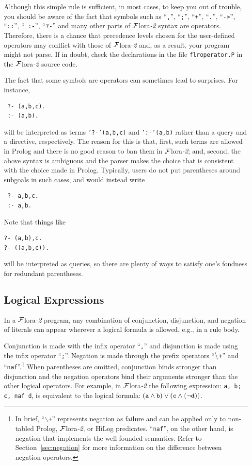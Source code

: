 \documentclass[11pt]{article}
\newcommand{\FLORA}{{\mbox{\sc ${\cal F}${lora}\rm\emph{-2}}}\xspace}
\newcommand{\PLGNAF}{\mbox{\tt \ensuremath{\tt\backslash}+}\xspace}
\newcommand{\SILKNAF}{{{\tt naf}}\xspace}
\begin{document}
Although this simple rule is sufficient, in most cases, to keep you out of
trouble, you should be aware of the fact that symbols such as ``{\tt ,}'',
``{\tt ;}'', ``{\tt +}'', ``{\tt .}'', ``{\tt ->}'', ``{\tt ::}'', ``{\tt
  :-}'', ``{\tt ?-}'' and many
other parts of \FLORA syntax are operators. Therefore, there is a chance
that precedence levels chosen for the user-defined operators may conflict with
those of \FLORA and, as a result, your program might not parse. If in
doubt, check the declarations in the file {\tt flroperator.P} in the \FLORA
source code.

The fact that some symbols are operators can sometimes lead to
surprises. For instance,
\begin{verbatim}
 ?- (a,b,c).
 :- (a,b).
\end{verbatim}
will be interpreted as terms {\tt '?-'(a,b,c)} and {\tt ':-'(a,b)} rather
than a query and a directive, respectively. The reason for this is that,
first, such terms are allowed in Prolog and there is no good reason to ban
them in \FLORA; and, second, the above syntax is ambiguous and the parser
makes the choice that is consistent with the choice made in
Prolog. Typically, users do not put parentheses around subgoals in such
cases, and would instead write
\begin{verbatim}
 ?- a,b,c.
 :- a,b.  
\end{verbatim}
Note that things like
\begin{verbatim}
?- (a,b),c.  
?- ((a,b,c)).
\end{verbatim}
will be interpreted as queries, so there are plenty of ways to satisfy
one's fondness for redundant parentheses.


\subsection{Logical Expressions}


%
In a \FLORA program, any combination of conjunction, disjunction, and
negation of literals can appear wherever a logical formula is allowed,
e.g., in a rule body.

Conjunction is made with the infix operator ``{\tt ,}'' and
disjunction is made using the infix operator ``{\tt ;}''.  Negation is made
through the prefix operators ``\PLGNAF'' and ``\SILKNAF''.\footnote{
  In brief, ``{\tt $\backslash$+}'' represents negation as
  failure and can be applied only to non-tabled Prolog, \FLORA, or HiLog
  predicates. ``\SILKNAF'', on the other hand, is negation that
  implements the well-founded semantics.  Refer to
  Section~\ref{sec:negation} for more information on the difference between
  negation operators. 
  }
When parentheses are omitted, conjunction binds stronger than disjunction
and the negation operators bind their arguments stronger than the other
logical operators.  For example, in \FLORA the following expression:
{\tt a, b; c, \SILKNAF d}, is equivalent to the logical formula: $\tt (a
\wedge b) \vee (c \wedge (\neg d))$.
\end{document}

